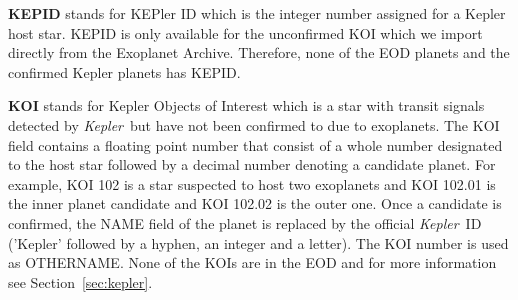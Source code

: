 \documentclass[11pt,preprint]{aastex}
\def\kepler{\textit{Kepler}}
\begin{document}
\begin{CJK*}{UTF8}{gbsn}
{\bf KEPID} stands for KEPler ID which is the integer number assigned for a Kepler host star. KEPID is only available for the unconfirmed KOI which we import directly from the Exoplanet Archive. Therefore, none of the EOD planets and the confirmed Kepler planets has KEPID.


{\bf KOI} stands for Kepler Objects of Interest which is a star with transit signals detected by \kepler\ but have not been confirmed to due to exoplanets. The KOI field contains a floating point number that consist of a whole number designated to the host star followed by a decimal number denoting a candidate planet. For example, KOI 102 is a star suspected to host two exoplanets and KOI 102.01 is the inner planet candidate and KOI 102.02 is the outer one. Once a candidate is confirmed, the NAME field of the planet is replaced by the official \kepler\ ID ('Kepler' followed by a hyphen, an integer and a letter). The KOI number is used as OTHERNAME. None of the KOIs are in the EOD and for more information see Section~\ref{sec:kepler}. 

\begin{comment}
\textit {Sharon: you need to say what KOI stores. When writing each
  field, keep in mind you need to cover the following so that the
  reader will completely understand: (1) what the field stands for
  (e.g., in case of an abbreviation like KOI); (2) what the field
  physically means, like `KOI' means planet candidates that have transit
  signals as detected by \kepler\ but have not been confirmed, and
  make sure to be thorough at what you say -- sometimes things are not
  that obvious to an outsider reader, e.g., think if a cosmologist
  would understand what you're saying when reading it; (3) what the
  field actually contains, e.g. KOI contains the KOI number designated
  by the \kepler\ team (right?), it is a floating point number, and
  sometimes maybe even worth giving an example, e.g. KOI 30.1 or
  something...; (4) why we added this new field, if this information
  is helpful, or if it's a revised field since \cite{Wright2011}, what
  is changed. Also, use \kepler\ (which is a defined symbol in our ms.tex file),
  instead of typing out Kepler, since you need italic.
  Don't be afraid to write more! Being concise is important, but it's
  always easier to trim down things than to add things on, especially
  for a documentation type of paper like this. Let's be thorough at
  first, then try to reach optimal conciseness.}
 \end{comment}


\end{CJK*}
\end{document}
